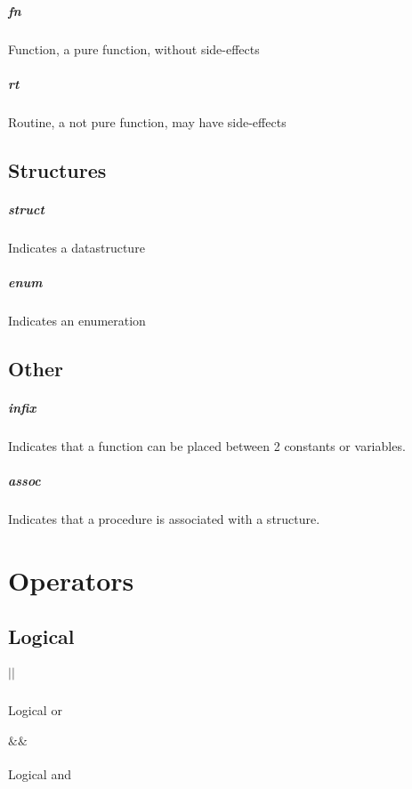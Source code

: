 \documentclass{report}
\begin{document}
\paragraph{fn} Function, a pure function, without side-effects
\paragraph{rt} Routine, a not pure function, may have side-effects

\section{Structures}
\paragraph{struct} Indicates a datastructure
\paragraph{enum} Indicates an enumeration


\section {Other}

\paragraph{infix} Indicates that a function can be placed between 2 constants or variables.
\paragraph{assoc} Indicates that a procedure is associated with a structure.


\chapter{Operators}

\section{Logical}

\paragraph{$||$} Logical or
\paragraph{$\&\&$} Logical and
\end{document}
